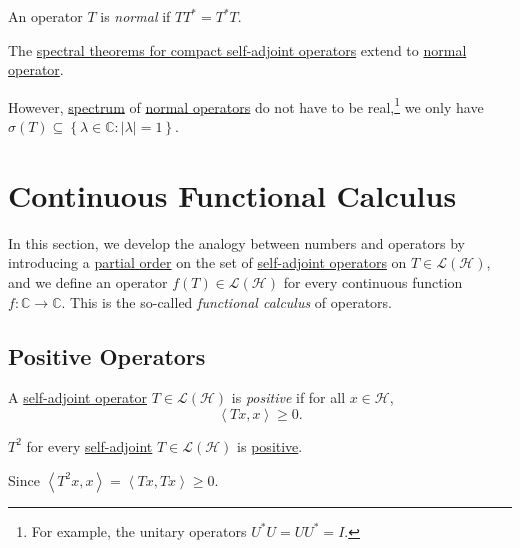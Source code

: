 \begin{definition}\label{def:normal-op}
	An operator \(T\) is \emph{normal} if \(T T^{\ast} = T^{\ast} T\).
\end{definition}

\begin{remark}
	The \hyperref[thm:spectral-theorem-for-compact-self-adjoint-op]{spectral theorems for compact self-adjoint operators} extend to \hyperref[def:normal-op]{normal operator}.
\end{remark}

However, \hyperref[def:spectrum-point]{spectrum} of \hyperref[def:normal-op]{normal operators} do not have to be real,\footnote{For example, the unitary operators \(U^{\ast} U = U U^{\ast} = I\).} we only have \(\sigma (T) \subseteq \left\{ \lambda \in \mathbb{C} \colon \vert \lambda  \vert =1 \right\} \).

\section{Continuous Functional Calculus}
In this section, we develop the analogy between numbers and operators by introducing a \hyperref[def:partial-order]{partial order} on the set of \hyperref[def:self-adjoint-op]{self-adjoint operators} on \(T\in \mathcal{L} (\mathcal{H} )\), and we define an operator \(f(T) \in \mathcal{L} (\mathcal{H} )\) for every continuous function \(f\colon \mathbb{C} \to \mathbb{C} \). This is the so-called \emph{functional calculus} of operators.

\subsection{Positive Operators}
\begin{definition}\label{def:positive-op}
	A \hyperref[def:self-adjoint-op]{self-adjoint operator} \(T\in \mathcal{L} (\mathcal{H} )\) is \emph{positive} if for all \(x\in \mathcal{H} \),
	\[
		\left\langle Tx, x \right\rangle \geq 0.
	\]
\end{definition}

\begin{eg}
	\(T^2\) for every \hyperref[def:self-adjoint-op]{self-adjoint} \(T\in \mathcal{L} (\mathcal{H} )\) is \hyperref[def:positive-op]{positive}.
\end{eg}
\begin{explanation}
	Since \(\left\langle T^2 x, x \right\rangle = \left\langle Tx, Tx \right\rangle \geq 0\).
\end{explanation}


